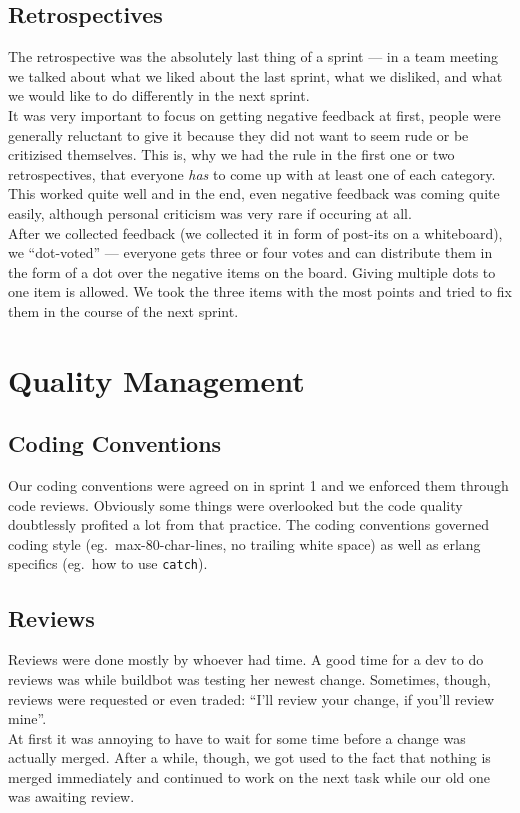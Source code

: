 \documentclass[11pt,a4paper]{report}
\begin{document}
\subsection{Retrospectives}
The retrospective was the absolutely last thing of a sprint --- in a team
meeting we talked about what we liked about the last sprint, what we disliked,
and what we would like to do differently in the next sprint. \\
It was very important to focus on getting negative feedback at first, people
were generally reluctant to give it because they did not want to seem rude or
be critizised themselves. This is, why we had the rule in the first one or two
retrospectives, that everyone {\em has\/} to come up with at least one of each
category. This worked quite well and in the end, even negative feedback was
coming quite easily, although personal criticism was very rare if occuring at
all. \\
After we collected feedback (we collected it in form of post-its on a
whiteboard), we ``dot-voted'' --- everyone gets three or four votes and can
distribute them in the form of a dot over the negative items on the board.
Giving multiple dots to one item is allowed. We took the three items with the
most points and tried to fix them in the course of the next sprint.

\section{Quality Management}
\subsection*{Coding Conventions}
Our coding conventions were agreed on in sprint 1 and we enforced them through
code reviews. Obviously some things were overlooked but the code quality
doubtlessly profited a lot from that practice.
The coding conventions governed coding style (eg.\ max-80-char-lines, no
trailing white space) as well as erlang specifics (eg.\ how to use {\tt catch}).
\subsection*{Reviews}
Reviews were done mostly by whoever had time. A good time for a dev to do 
reviews was while buildbot was testing her newest change. Sometimes, though,
reviews were requested or even traded: ``I'll review your change, if you'll
review mine''. \\
At first it was annoying to have to wait for some time before a change was
actually merged. After a while, though, we got used to the fact that nothing is
merged immediately and continued to work on the next task while our old one was
awaiting review.
\end{document}

